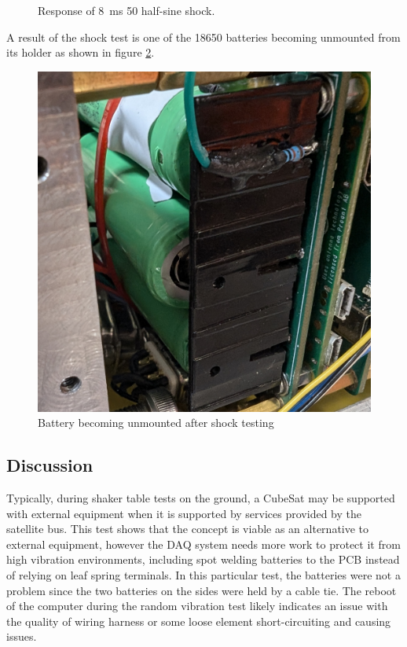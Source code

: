 \documentclass[]{report}
\begin{document}
\begin{figure}[H]
  \centering
  
  \caption{Response of \SI{8}{\milli\second} \SI{50}{\gacc} half-sine shock.}
  \label{fig:shock-table-resp}
\end{figure}

A result of the shock test is one of the 18650 batteries becoming unmounted from its holder as shown in figure \ref{fig:dislodged-battery}.

\begin{figure}[H]
  \centering
  \includegraphics[width=0.7\linewidth]{images/dislodged_battery.jpg}
  \caption{Battery becoming unmounted after shock testing}
  \label{fig:dislodged-battery}
\end{figure}

\subsection{Discussion}

Typically, during shaker table tests on the ground, a CubeSat may be supported with external equipment when it is supported by services provided by the satellite bus. This test shows that the concept is viable as an alternative to external equipment, however the DAQ system needs more work to protect it from high vibration environments, including spot welding batteries to the PCB instead of relying on leaf spring terminals. In this particular test, the batteries were not a problem since the two batteries on the sides were held by a cable tie. The reboot of the computer during the random vibration test likely indicates an issue with the quality of wiring harness or some loose element short-circuiting and causing issues.
\end{document}
